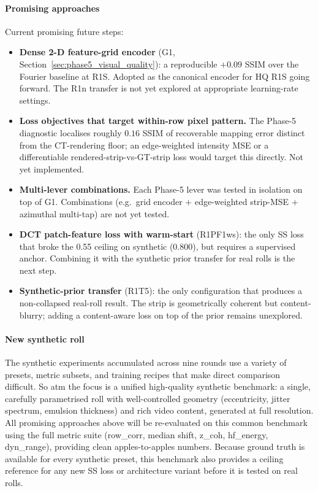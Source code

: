 \documentclass[11pt,a4paper]{article}
\begin{document}
\paragraph{Promising approaches } Current promising future steps:
\begin{itemize}
    \item \textbf{Dense 2-D feature-grid encoder} (G1, Section~\ref{sec:phase5_visual_quality}): a reproducible $+0.09$ SSIM over the Fourier baseline at R1S. Adopted as the canonical encoder for HQ R1S going forward. The R1n transfer is not yet explored at appropriate learning-rate settings.
    \item \textbf{Loss objectives that target within-row pixel pattern.} The Phase-5 diagnostic localises roughly $0.16$ SSIM of recoverable mapping error distinct from the CT-rendering floor; an edge-weighted intensity MSE or a differentiable rendered-strip-vs-GT-strip loss would target this directly. Not yet implemented.
    \item \textbf{Multi-lever combinations.} Each Phase-5 lever was tested in isolation on top of G1. Combinations (e.g.\ grid encoder $+$ edge-weighted strip-MSE $+$ azimuthal multi-tap) are not yet tested.
    \item \textbf{DCT patch-feature loss with warm-start} (R1PF1ws): the only SS loss that broke the 0.55 ceiling on synthetic (0.800), but requires a supervised anchor. Combining it with the synthetic prior transfer for real rolls is the next step.
    \item \textbf{Synthetic-prior transfer} (R1T5): the only configuration that produces a non-collapsed real-roll result. The strip is geometrically coherent but content-blurry; adding a content-aware loss on top of the prior remains unexplored.
\end{itemize}

\paragraph{New synthetic roll} The synthetic experiments accumulated across nine rounds use a variety of presets, metric subsets, and training recipes that make direct comparison difficult. So atm the focus is a unified high-quality synthetic benchmark: a single, carefully parametrised roll with well-controlled geometry (eccentricity, jitter spectrum, emulsion thickness) and rich video content, generated at full resolution. All promising approaches above will be re-evaluated on this common benchmark using the full metric suite (row\_corr, median shift, z\_coh, hf\_energy, dyn\_range), providing clean apples-to-apples numbers. Because ground truth is available for every synthetic preset, this benchmark also provides a ceiling reference for any new SS loss or architecture variant before it is tested on real rolls.
\end{document}
